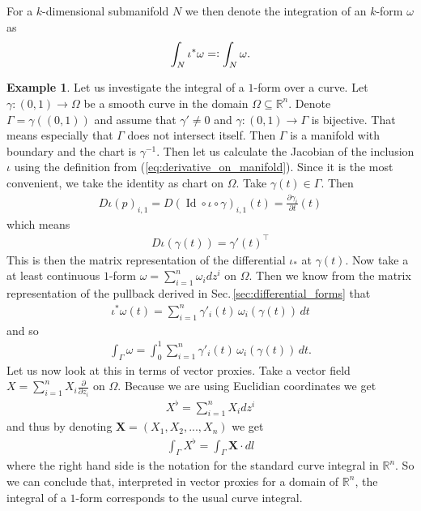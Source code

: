\documentclass[12pt,a4paper]{article}
\numberwithin{equation}{subsection}
\numberwithin{lemma}{subsection}
\theoremstyle{definition}
\newtheorem{example}[lemma]{Example}
\DeclareMathOperator{\Id}{Id}
\newcommand{\real}{\mathbb{R}}
\begin{document}
For a $k$-dimensional submanifold $N$ we then denote the integration of an 
$k$-form $\omega$ as
\begin{align*}
    \int_N \iota^*\omega =\vcentcolon \int_N \omega.
\end{align*} 

\begin{example}\label{ex:integration_1_forms}
    Let us investigate the integral of a $1$-form over a curve. 
    Let $\gamma: (0,1) \rightarrow \Omega$ be a smooth curve in the domain $\Omega 
    \subseteq \real^n$. Denote $\Gamma = \gamma((0,1))$ and assume that 
    $\gamma' \neq 0$ and $\gamma: (0,1) \rightarrow \Gamma$ is bijective.
    That means especially that $\Gamma$ does not intersect itself.
    Then $\Gamma$ is a manifold with boundary and the chart is $\gamma^{-1}$.
    Then let us calculate the Jacobian of the inclusion $\iota$ using the 
    definition from (\ref{eq:derivative_on_manifold}). 
    Since it is the most convenient, we take the 
    identity as chart on $\Omega$. Take $\gamma(t) \in \Gamma$. Then
    \begin{align*}
        D\iota(p)_{i,1} = D(\Id \circ \iota \circ \gamma)_{i,1}(t)
        = \frac{\partial \gamma_i}{\partial t}(t)
    \end{align*} 
    which means
    \begin{align*}
        D\iota(\gamma(t)) = \gamma'(t)^\top
    \end{align*}
    This is then the matrix representation of the differential $\iota_*$ at 
    $\gamma(t)$.
    Now take a at least continuous $1$-form $\omega = \sum_{i=1}^n \omega_i dz^i$ 
    on $\Omega$. Then we know from the matrix representation of the 
    pullback derived in Sec.\,\ref{sec:differential_forms} that 
    \begin{align*}
        \iota^*\omega (t) = \sum_{i=1}^n \gamma'_i(t) \, \omega_i(\gamma(t)) \,dt
    \end{align*}
    and so
    \begin{align*}
        \int_\Gamma \omega = \int_0^1\sum_{i=1}^n \gamma'_i(t) \, \omega_i(\gamma(t)) \,dt.
    \end{align*}
    Let us now look at this in terms of vector proxies. Take a vector field 
    $X = \sum_{i=1}^n X_i \frac{\partial}{\partial z_i}$ on $\Omega$.
    Because we are using Euclidian coordinates we get
    \begin{align*}
        X^\flat = \sum_{i=1}^n X_i dz^i
    \end{align*}
    and thus by denoting $\mathbf{X} = (X_1, X_2, ..., X_n)$ we get
    \begin{align*}
        \int_\Gamma X^\flat = \int_\Gamma \mathbf{X}\cdot dl
    \end{align*}
    where the right hand side is the notation for the standard curve integral 
    in $\real^n$. So we can conclude that, interpreted in vector proxies for 
    a domain of $\real^n$, the integral of a $1$-form corresponds to the usual 
    curve integral.
\end{example}
\end{document}
